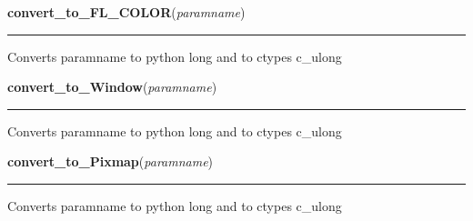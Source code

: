     \label{xformslib:library:convert_to_ulong}

    \vspace{0.5ex}

\hspace{.8\funcindent}\begin{boxedminipage}{\funcwidth}

    \raggedright \textbf{convert\_to\_FL\_COLOR}(\textit{paramname})

    \vspace{-1.5ex}

    \rule{\textwidth}{0.5\fboxrule}
\setlength{\parskip}{2ex}

Converts paramname to python long and to ctypes c\_ulong
\setlength{\parskip}{1ex}
    \end{boxedminipage}

    \label{xformslib:library:convert_to_ulong}

    \vspace{0.5ex}

\hspace{.8\funcindent}\begin{boxedminipage}{\funcwidth}

    \raggedright \textbf{convert\_to\_Window}(\textit{paramname})

    \vspace{-1.5ex}

    \rule{\textwidth}{0.5\fboxrule}
\setlength{\parskip}{2ex}

Converts paramname to python long and to ctypes c\_ulong
\setlength{\parskip}{1ex}
    \end{boxedminipage}

    \label{xformslib:library:convert_to_ulong}

    \vspace{0.5ex}

\hspace{.8\funcindent}\begin{boxedminipage}{\funcwidth}

    \raggedright \textbf{convert\_to\_Pixmap}(\textit{paramname})

    \vspace{-1.5ex}

    \rule{\textwidth}{0.5\fboxrule}
\setlength{\parskip}{2ex}

Converts paramname to python long and to ctypes c\_ulong
\setlength{\parskip}{1ex}
    \end{boxedminipage}

